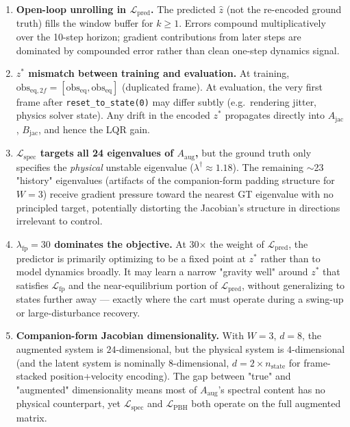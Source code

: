 \documentclass[11pt]{article}
\newcommand{\loss}[1]{\mathcal{L}_{\text{#1}}}
\newcommand{\zstar}{z^{*}}
\begin{document}
\begin{enumerate}[leftmargin=2em]
  \item \textbf{Open-loop unrolling in $\loss{pred}$.} The predicted
        $\hat z$ (not the re-encoded ground truth) fills the window buffer for
        $k \geq 1$. Errors compound multiplicatively over the 10-step horizon;
        gradient contributions from later steps are dominated by compounded
        error rather than clean one-step dynamics signal.

  \item \textbf{$z^*$ mismatch between training and evaluation.} At training,
        $\text{obs}_{\text{eq},2f} = [\text{obs}_{\text{eq}}, \text{obs}_{\text{eq}}]$
        (duplicated frame). At evaluation, the very first frame after
        \texttt{reset\_to\_state(0)} may differ subtly (e.g.\ rendering jitter,
        physics solver state). Any drift in the encoded $\zstar$ propagates
        directly into $A_{\text{jac}}$, $B_{\text{jac}}$, and hence the LQR
        gain.

  \item \textbf{$\loss{spec}$ targets all 24 eigenvalues of $A_{\text{aug}}$,}
        but the ground truth only specifies the \emph{physical} unstable
        eigenvalue ($\lambda^\dagger \approx 1.18$). The remaining $\sim$23
        "history" eigenvalues (artifacts of the companion-form padding
        structure for $W=3$) receive gradient pressure toward the nearest GT
        eigenvalue with no principled target, potentially distorting the
        Jacobian's structure in directions irrelevant to control.

  \item \textbf{$\lambda_{\text{fp}} = 30$ dominates the objective.} At 30$\times$
        the weight of $\loss{pred}$, the predictor is primarily optimizing to
        be a fixed point at $\zstar$ rather than to model dynamics broadly. It
        may learn a narrow "gravity well" around $\zstar$ that satisfies
        $\loss{fp}$ and the near-equilibrium portion of $\loss{pred}$, without
        generalizing to states further away --- exactly where the
        cart must operate during a swing-up or large-disturbance recovery.

  \item \textbf{Companion-form Jacobian dimensionality.} With $W=3$, $d=8$,
        the augmented system is $24$-dimensional, but the physical system is
        $4$-dimensional (and the latent system is nominally $8$-dimensional,
        $d = 2 \times n_{\text{state}}$ for frame-stacked position+velocity
        encoding). The gap between "true" and "augmented" dimensionality means
        most of $A_{\text{aug}}$'s spectral content has no physical
        counterpart, yet $\loss{spec}$ and $\loss{PBH}$ both operate on the
        full augmented matrix.
\end{enumerate}
\end{document}
